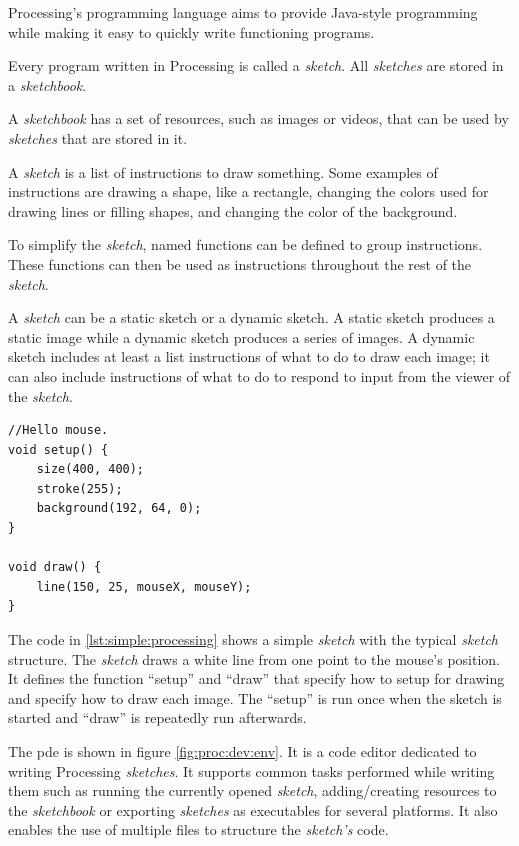 \documentclass{./llncs2e/llncs}
\begin{document}
	Processing's programming language aims to provide Java-style programming while making it easy to quickly write functioning programs. 
	
	Every program written in Processing is called a \emph{sketch}. 
	All \emph{sketches} are stored in a \emph{sketchbook}.
	
	A \emph{sketchbook} has a set of resources, such as images or videos, that can be used by \emph{sketches} that are stored in it.
	
	A \emph{sketch} is a list of instructions to draw something. 
	Some examples of instructions are drawing a shape, like a rectangle, changing the colors used for drawing lines or filling shapes, and changing the color of the background.
	
	To simplify the \emph{sketch}, named functions can be defined to group instructions. 
	These functions can then be used as instructions throughout the rest of the \emph{sketch}.
	
	A \emph{sketch} can be a static sketch or a dynamic sketch. 
	A static sketch produces a static image while a dynamic sketch produces a series of images. 
	A dynamic sketch includes at least a list instructions of what to do to draw each image; it can also include instructions of what to do to respond to input from the viewer of the \emph{sketch}.
	
	\lstset{ %
		basicstyle=\tt\small,
		numbers=left,
		numberstyle=\tt\small,
		frame=lines,
	}
	\begin{lstlisting}[caption={A simple Processing sketch.},label={lst:simple:processing}]
//Hello mouse.
void setup() {
	size(400, 400);
	stroke(255);
	background(192, 64, 0);
}

void draw() {
	line(150, 25, mouseX, mouseY);
}
	\end{lstlisting}
	
	The code in \ref{lst:simple:processing} shows a simple \emph{sketch} with the typical \emph{sketch} structure. 
	The \emph{sketch} draws a white line from one point to the mouse's position. 
	It defines the function ``setup'' and  ``draw'' that specify how to setup for drawing and specify how to draw each image. 
	The ``setup'' is run once when the sketch is started and ``draw'' is repeatedly run afterwards.
	
	The \ac{pde} is shown in figure \ref{fig:proc:dev:env}. 
	It is a code editor dedicated to writing Processing \emph{sketches}. 
	It supports common tasks performed while writing them such as running the currently opened \emph{sketch}, adding/creating resources to the \emph{sketchbook} or exporting \emph{sketches} as executables for several platforms. 
	It also enables the use of multiple files to structure the \emph{sketch's} code.
	
\end{document}

